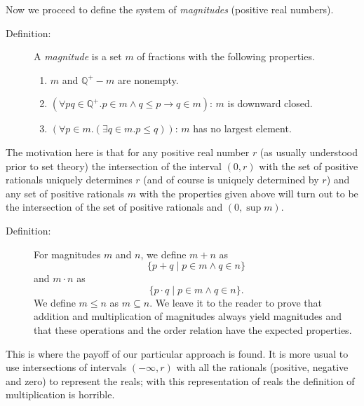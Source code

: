 \documentclass[12pt]{book}
\begin{document}
Now we proceed to define the system of {\em magnitudes\/} (positive
real numbers).

\begin{description}

\item[Definition:] A {\em magnitude\/} is a set $m$ of fractions with
the following properties.

\begin{enumerate}

\item $m$ and ${\mathbb Q}^+ - m$ are nonempty.

\item $(\forall pq \in {\mathbb Q}^+.p \in m \wedge q \leq p
\rightarrow q \in m)$: $m$ is downward closed.

\item $(\forall p \in m.(\exists q \in m.p \leq q))$: $m$ has no
largest element.

\end{enumerate}

\end{description}

The motivation here is that for any positive real number $r$ (as
usually understood prior to set theory) the intersection of the
interval $(0,r)$ with the set of positive rationals uniquely
determines $r$ (and of course is uniquely determined by $r$) and any
set of positive rationals $m$ with the properties given above will
turn out to be the intersection of the set of positive rationals and
$(0,\sup m)$.

\begin{description}

\item[Definition:] For magnitudes $m$ and $n$, we define $m+n$ as
$$\{p+q \mid p \in m \wedge q \in n\}$$ and $m\cdot n$ as
$$\{p\cdot q \mid p \in m \wedge q \in n\}.$$  We define $m \leq
n$ as $m \subseteq n$.  We leave it to the reader to prove that
addition and multiplication of magnitudes always yield magnitudes and
that these operations and the order relation have the expected
properties.

\end{description}

This is where the payoff of our particular approach is found.  It is
more usual to use intersections of intervals $(-\infty,r)$ with all
the rationals (positive, negative and zero) to represent the reals; with this representation of reals
the definition of multiplication is horrible.
\end{document}
